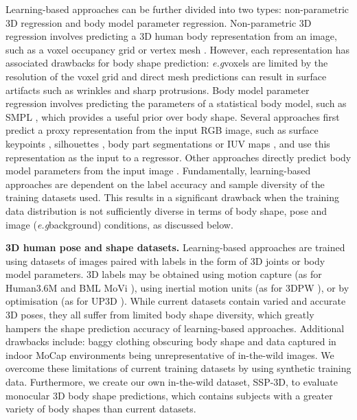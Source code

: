 \documentclass{bmvc2k}
\def\eg{\emph{e.g}\bmvaOneDot}
\begin{document}
Learning-based approaches can be further divided into two types: non-parametric 3D regression and body model parameter regression. Non-parametric 3D regression involves predicting a 3D human body representation from an image, such as a voxel occupancy grid \cite{varol18_bodynet} or vertex mesh \cite{kolotouros2019cmr}. However, each representation has associated drawbacks for body shape prediction: \eg voxels are limited by the resolution of the voxel grid and direct mesh predictions can result in surface artifacts such as wrinkles and sharp protrusions. Body model parameter regression involves predicting the parameters of a statistical body model, such as SMPL \cite{SMPL:2015}, which provides a useful prior over body shape. Several approaches first predict a proxy representation from the input RGB image, such as surface keypoints \cite{Lassner:UP:2017, pavlakos2018humanshape}, silhouettes \cite{pavlakos2018humanshape, tan2017}, body part segmentations \cite{omran2018nbf} or IUV maps \cite{zhang2019danet, Xu_2019_ICCV}, and use this representation as the input to a regressor. Other approaches directly predict body model parameters from the input image \cite{hmrKanazawa17, kolotouros2019spin, Rong_2019_ICCV}. Fundamentally, learning-based approaches are dependent on the label accuracy and sample diversity of the training datasets used. This results in a significant drawback when the training data distribution is not sufficiently diverse in terms of body shape, pose and image (\eg background) conditions, as discussed below.

\noindent \textbf{3D human pose and shape datasets.} Learning-based approaches are trained using datasets of images paired with labels in the form of 3D joints or body model parameters. 3D labels may be obtained using motion capture (as for Human3.6M \cite{h36m_pami} and BML MoVi \cite{movi2020}), using inertial motion units (as for 3DPW \cite{vonMarcard2018}), or by optimisation (as for UP3D \cite{Lassner:UP:2017}). While current datasets contain varied and accurate 3D poses, they all suffer from limited body shape diversity, which greatly hampers the shape prediction accuracy of learning-based approaches. Additional drawbacks include: baggy clothing obscuring body shape and data captured in indoor MoCap environments being unrepresentative of in-the-wild images. We overcome these limitations of current training datasets by using synthetic training data. Furthermore, we create our own in-the-wild dataset, SSP-3D, to evaluate monocular 3D body shape predictions, which contains subjects with a greater variety of body shapes than current datasets.
\end{document}
